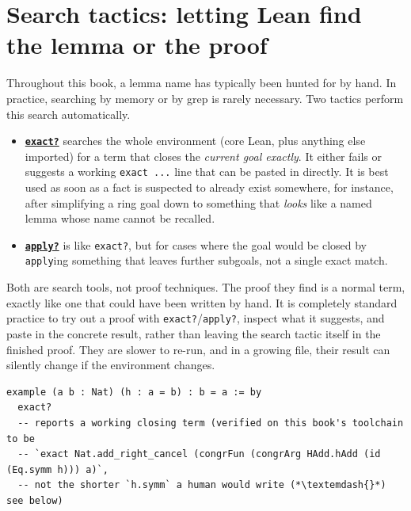 \section{Search tactics: letting Lean find the lemma or the proof}\label{sec:13-working-efficiently:01-search-tactics:1}

Throughout this book, a lemma name has typically been hunted for by hand. In practice, searching by memory or by grep is rarely necessary. Two tactics perform this search automatically.

\begin{itemize}
\tightlist
\item
  \textbf{\href{https://lean-lang.org/doc/reference/latest/Tactic-Proofs/Tactic-Reference/}{\texttt{exact?}}} searches the whole environment (core Lean, plus anything else imported) for a term that closes the \emph{current goal exactly}. It either fails or suggests a working \texttt{exact ...} line that can be pasted in directly. It is best used as soon as a fact is suspected to already exist somewhere, for instance, after simplifying a ring goal down to something that \emph{looks} like a named lemma whose name cannot be recalled.
\item
  \textbf{\href{https://lean-lang.org/doc/reference/latest/Tactic-Proofs/Tactic-Reference/}{\texttt{apply?}}} is like \texttt{exact?}, but for cases where the goal would be closed by \texttt{apply}ing something that leaves further subgoals, not a single exact match.
\end{itemize}

Both are search tools, not proof techniques. The proof they find is a normal term, exactly like one that could have been written by hand. It is completely standard practice to try out a proof with \texttt{exact?}/\texttt{apply?}, inspect what it suggests, and paste in the concrete result, rather than leaving the search tactic itself in the finished proof. They are slower to re-run, and in a growing file, their result can silently change if the environment changes.

\begin{lstlisting}
example (a b : Nat) (h : a = b) : b = a := by
  exact?
  -- reports a working closing term (verified on this book's toolchain to be
  -- `exact Nat.add_right_cancel (congrFun (congrArg HAdd.hAdd (id (Eq.symm h))) a)`,
  -- not the shorter `h.symm` a human would write (*\textemdash{}*) see below)
\end{lstlisting}

